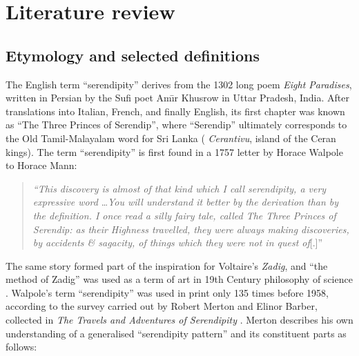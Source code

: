 
\section{Literature review} \label{sec:literature-review}

\subsection{Etymology and selected definitions} \label{sec:overview-serendipity}  
The English term ``serendipity'' derives from the 1302 long poem \emph{Eight Paradises}, written in Persian by the Sufi poet Am\={\i}r Khusrow in Uttar Pradesh, India.  After translations into Italian, French, and finally English, its first chapter was known as ``The Three Princes of Serendip'', where ``Serendip'' ultimately corresponds to the Old Tamil-Malayalam word for Sri Lanka (%
\emph{Cerantivu}, island of the Ceran kings).
%
The term ``serendipity'' is first found in a 1757 letter by Horace Walpole to Horace Mann:
\begin{quote}
\emph{``This discovery is almost of that kind which I call serendipity, a very expressive
word} \ldots \emph{You will understand it better by the derivation than by the
definition. I once read a silly fairy tale, called The Three Princes of Serendip:
as their Highness travelled, they were always making discoveries, by accidents
\& sagacity, of things which they were not in quest of}[.]''~\cite[p. 633]{van1994anatomy}
\end{quote}
The same story formed part of the inspiration for Voltaire's \emph{Zadig}, and ``the method of Zadig'' was used as a term of art in 19th Century philosophy of science \cite{huxley1894science}.
Walpole's term ``serendipity'' was used in print only 135 times before 1958, according to the survey carried out by Robert Merton and Elinor Barber, collected in \emph{The Travels and Adventures of Serendipity} \citep{merton}.  Merton describes his own understanding of a generalised ``serendipity pattern'' and its constituent parts as follows:

